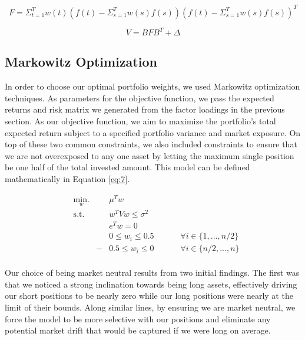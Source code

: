 \documentclass[final]{article}
\begin{document}
\begin{equation}
\label{eq:5}
    F = \Sigma_{t=1}^{T}w(t)(f(t)-\Sigma_{s=1}^{T}w(s)f(s))(f(t)-\Sigma_{s=1}^{T}w(s)f(s))^{T}
\end{equation}

\begin{equation}
    \label{eq:6}
    V = BFB^T+\Delta
\end{equation}

\subsection{Markowitz Optimization}
\hspace{\parindent}In order to choose our optimal portfolio weights, we used Markowitz optimization techniques. As parameters for the objective function, we pass the expected returns and risk matrix we generated from the factor loadings in the previous section. As our objective function, we aim to maximize the portfolio's total expected return subject to a specified portfolio variance and market exposure. On top of these two common constraints, we also included constraints to ensure that we are not overexposed to any one asset by letting the maximum single position be one half of the total invested amount. This model can be defined mathematically in Equation \ref{eq:7}.

\begin{equation}
\label{eq:7}
\begin{aligned}
& \underset{w}{\text{min.}}
& & \mu^T w \\
& \text{s.t.}
& & w^T V w\leq\sigma^2 \\
& & & e^T w=0 \\
& & & 0\leq w_i \leq 0.5
& & & & \forall i\in\{1,...,n/2\} \\
& & -&0.5\leq w_i \leq 0
& & & & \forall i\in\{n/2,...,n\} \\
\end{aligned}
\end{equation}

Our choice of being market neutral results from two initial findings. The first was that we noticed a strong inclination towards being long assets, effectively driving our short positions to be nearly zero while our long positions were nearly at the limit of their bounds. Along similar lines, by ensuring we are market neutral, we force the model to be more selective with our positions and eliminate any potential market drift that would be captured if we were long on average.
\end{document}
